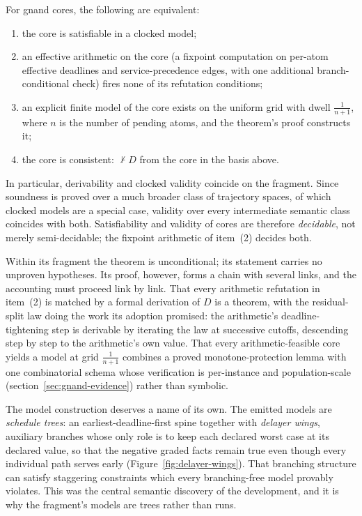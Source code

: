 \begin{theorem}
\label{thm:gnand-completeness}
For gnand cores, the following are equivalent:
\begin{enumerate}
\item the core is satisfiable in a clocked model;
\item an effective arithmetic on the core (a fixpoint computation on
  per-atom effective deadlines and service-precedence edges, with
  one additional branch-conditional check) fires none of its
  refutation conditions;
\item an explicit finite model of the core exists on the uniform
  grid with dwell $\tfrac{1}{n+1}$, where $n$ is the number of
  pending atoms, and the theorem's proof constructs it;
\item the core is consistent: $\not\vdash D$ from the core in the
  basis above.
\end{enumerate}
\end{theorem}

In particular, derivability and clocked validity coincide on the
fragment. Since soundness is proved over a much broader class of
trajectory spaces, of which clocked models are a special case,
validity over every intermediate semantic class coincides with both.
Satisfiability and validity of cores are therefore
\emph{decidable}, not merely semi-decidable; the fixpoint arithmetic
of item~(2) decides both.

Within its fragment the theorem is unconditional; its statement
carries no unproven hypotheses. Its proof, however, forms a chain
with several links, and the accounting must proceed link by link.
That every arithmetic refutation in item~(2) is matched by a formal
derivation of $D$ is a theorem, with the residual-split law doing
the work its adoption promised: the arithmetic's
deadline-tightening step is derivable by iterating the law at
successive cutoffs, descending step by step to the arithmetic's own
value. That every arithmetic-feasible core yields a model at grid
$\tfrac{1}{n+1}$ combines a proved monotone-protection lemma with one
combinatorial schema whose verification is per-instance and
population-scale (section~\ref{sec:gnand-evidence}) rather than
symbolic.

\begin{remark}
\label{rem:delayer-wings}
The model construction deserves a name of its own. The emitted
models are \emph{schedule trees}: an earliest-deadline-first spine
together with \emph{delayer wings}, auxiliary branches whose only
role is to keep each declared worst case at its declared value, so
that the negative graded facts remain true even though every
individual path serves early (Figure~\ref{fig:delayer-wings}). That
branching structure can satisfy staggering constraints which every
branching-free model provably violates. This was the central
semantic discovery of the development, and it is why the fragment's
models are trees rather than runs.
\end{remark}

